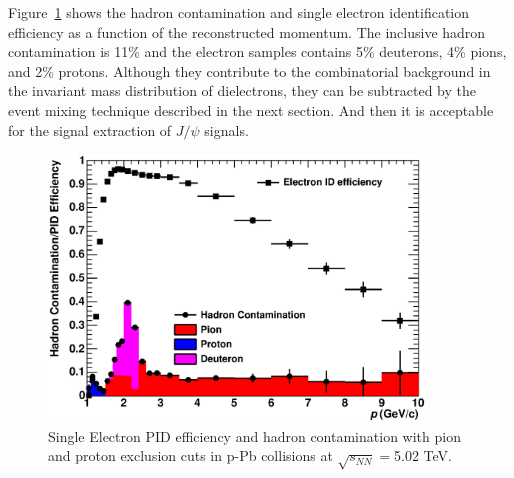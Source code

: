 {Figure~\ref{fig_4_hadcont}  shows the hadron contamination and single electron identification efficiency as a function of the reconstructed momentum. 
The inclusive hadron contamination is 11\% and the electron samples contains 5\% deuterons, 4\% pions, and 2\% protons. 
Although they contribute to the combinatorial background in the invariant mass distribution of dielectrons, they can be subtracted by the event mixing technique described in the next section. 
And then it is acceptable for the signal extraction of $J/\psi$ signals. 
\begin{figure}[!h]
  \centering
  \includegraphics[width=10cm]{chap4/figure/PID/PIDEffvsHadCont_MB_3p5.eps}
  \caption{Single Electron PID efficiency and hadron contamination with pion and proton exclusion cuts in p-Pb collisions at $\sqrt{s_{NN}}=$5.02 TeV.}
  \label{fig_4_hadcont}
\end{figure}

}
